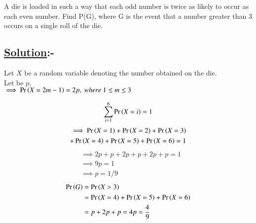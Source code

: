 \documentclass[journal,12pt,twocolumn]{IEEEtran}
\begin{document}
A die is loaded in such a way that each odd number is twice as likely to occur as
each even number. Find P(G), where G is the event that a number greater than
3 occurs on a single roll of the die.

\subsection*{\textbf{\underline{Solution}:-}}

Let $X$ be a random variable denoting the number obtained on the die.\\
Let  be $p$,\\
$\implies\Pr\left(X=2m-1\right)=2p,\ where\ 1\leq m \leq3$

\begin{align}
  \sum_{i=1}^{6}\Pr\left(X=i\right) = 1
  \end{align}
  \begin{align}
  \begin{split}
  \implies\Pr\left(X=1\right)+\Pr\left(X=2\right)+\Pr\left(X=3\right)\\+\Pr\left(X=4\right)+\Pr\left(X=5\right)+\Pr\left(X=6\right) =1
  \end{split}
  \end{align}
  \begin{align}
        &\implies 2p+p+2p+p+2p+p = 1\\
        &\implies 9p = 1\\
        &\implies p =1/9
  \end{align}
  \begin{align}
  \Pr\left(G\right) &= \Pr\left(X>3\right)\\
  &=\Pr\left(X=4\right)+\Pr\left(X=5\right)+\Pr\left(X=6\right)\\
  &=p+2p+p = 4p = \frac{4}{9}
  \end{align}
  
\end{document}
